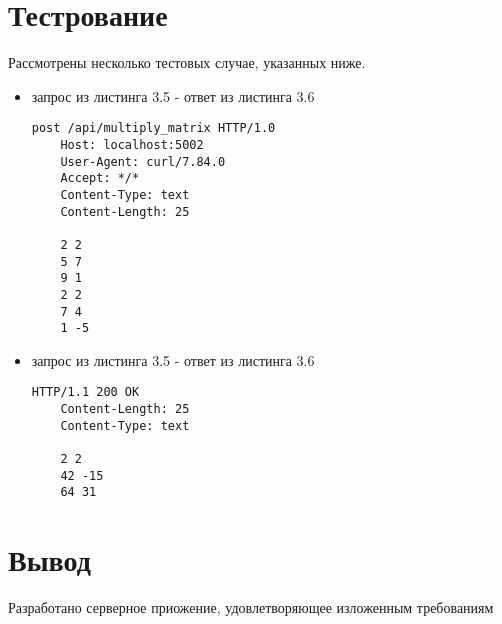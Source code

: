 \section{Тестрование}

Рассмотрены несколько тестовых случае, указанных ниже.

\begin{itemize}
	\item запрос из листинга 3.5 - ответ из листинга 3.6
	\begin{lstlisting}[caption={Запрос, проверяющий правильность ответа на корректных данных}]
	post /api/multiply_matrix HTTP/1.0
	Host: localhost:5002
	User-Agent: curl/7.84.0
	Accept: */*
	Content-Type: text
	Content-Length: 25
	
	2 2
	5 7
	9 1
	2 2
	7 4
	1 -5
	\end{lstlisting}
\end{itemize}

\begin{itemize}
	\item запрос из листинга 3.5 - ответ из листинга 3.6
	\begin{lstlisting}[caption={Ожидаемый ответ на запрос из листинга 3.5}]
	HTTP/1.1 200 OK
	Content-Length: 25
	Content-Type: text
	
	2 2
	42 -15
	64 31
	\end{lstlisting}
\end{itemize}

\newpage
\section*{Вывод}

Разработано серверное приожение, удовлетворяющее изложенным требованиям
